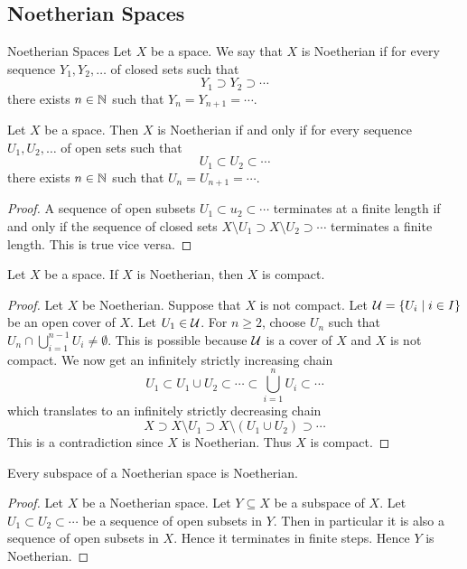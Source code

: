 \documentclass[a4paper]{article}
\begin{document}
\subsection{Noetherian Spaces}
\begin{defn}{Noetherian Spaces}{} Let $X$ be a space. We say that $X$ is Noetherian if for every sequence $Y_1,Y_2,\dots$ of closed sets such that $$Y_1\supset Y_2\supset\cdots$$ there exists $n\in\mathbb{N}$ such that $Y_n=Y_{n+1}=\cdots$. 
\end{defn}

\begin{prp}{}{} Let $X$ be a space. Then $X$ is Noetherian if and only if for every sequence $U_1,U_2,\dots$ of open sets such that $$U_1\subset U_2\subset\cdots$$ there exists $n\in\mathbb{N}$ such that $U_n=U_{n+1}=\cdots$. \tcbline
\begin{proof}
A sequence of open subsets $U_1\subset u_2\subset\cdots$ terminates at a finite length if and only if the sequence of closed sets $X\setminus U_1\supset X\setminus U_2\supset\cdots$ terminates a finite length. This is true vice versa. 
\end{proof}
\end{prp}

\begin{prp}{}{} Let $X$ be a space. If $X$ is Noetherian, then $X$ is compact. \tcbline
\begin{proof}
Let $X$ be Noetherian. Suppose that $X$ is not compact. Let $\mathcal{U}=\{U_i\;|\;i\in I\}$ be an open cover of $X$. Let $U_1\in\mathcal{U}$. For $n\geq 2$, choose $U_n$ such that $U_n\cap\bigcup_{i=1}^{n-1}U_i\neq\emptyset$. This is possible because $\mathcal{U}$ is a cover of $X$ and $X$ is not compact. We now get an infinitely strictly increasing chain $$U_1\subset U_1\cup U_2\subset\cdots\subset\bigcup_{i=1}^nU_i\subset\cdots$$ which translates to an infinitely strictly decreasing chain $$X\supset X\setminus U_1\supset X\setminus(U_1\cup U_2)\supset\cdots$$ This is a contradiction since $X$ is Noetherian. Thus $X$ is compact. 
\end{proof}
\end{prp}

\begin{prp}{}{} Every subspace of a Noetherian space is Noetherian. \tcbline
\begin{proof}
Let $X$ be a Noetherian space. Let $Y\subseteq X$ be a subspace of $X$. Let $U_1\subset U_2\subset\cdots$ be a sequence of open subsets in $Y$. Then in particular it is also a sequence of open subsets in $X$. Hence it terminates in finite steps. Hence $Y$ is Noetherian. 
\end{proof}
\end{prp}
\end{document}
